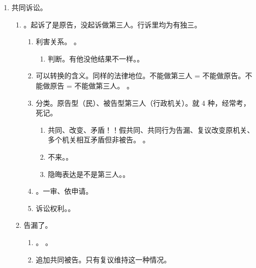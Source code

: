 \begin{enumerate}
  \item 共同诉讼。
        \begin{enumerate}
          \item {}。起诉了是原告，没起诉做第三人。行诉里均为有独三。
                \begin{enumerate}
                  \item 利害关系。 \yjt {}。
                        \begin{enumerate}
                          \item 判断。有他没他结果不一样。。
                        \end{enumerate}
                  \item 可以转换的含义。同样的法律地位。不能做第三人 = 不能做原告。不能做原告 = 不能做第三人。
                        。
                  \item 分类。原告型（民）、被告型第三人（行政机关）。就 4 种，经常考，死记。
                        \begin{enumerate}
                          \item 共同、改变、矛盾！！假共同、共同行为告漏、复议改变原机关、多个机关相互矛盾但非被告。
                                。
                          \item 不来。。
                          \item 隐晦表达是不是第三人。。
                        \end{enumerate}
                  \item {}。一审、依申请。
                  \item 诉讼权利。。
                \end{enumerate}
          \item 告漏了。
                \begin{enumerate}
                  \item {}。
                        。
                  \item 追加共同被告。只有复议维持这一种情况。

\end{enumerate}
\end{enumerate}
\end{enumerate}
